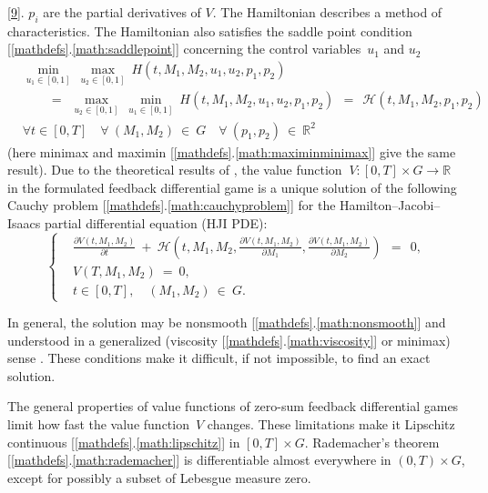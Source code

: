 \documentclass[11pt]{amsart}
\begin{document}
\cref{9}. $p_i$ are the partial derivatives of $V$.  The Hamiltonian describes a method of characteristics. The Hamiltonian also satisfies the saddle point condition [\ref{mathdefs}.\ref{math:saddlepoint}] concerning
the control variables~$ u_1 $ and
$ u_2 $
\begin{equation}
\begin{aligned}
& \min_{u_1 \in [0, 1]} \: \max_{u_2 \in [0, 1]} \: H(t, M_1, M_2, u_1, u_2,
  p_1, p_2) \\
& \qquad
= \:\: \max_{u_2 \in [0, 1]} \: \min_{u_1 \in [0, 1]} \: H(t, M_1, M_2, u_1,
  u_2, p_1, p_2) \:\:
= \:\: \mathcal{H} (t, M_1, M_2, p_1, p_2) \\
& \forall t \in [0, T] \quad \forall \: (M_1, M_2) \: \in \: G \quad \forall
  \: (p_1, p_2) \: \in \: \mathbb{R}^2
\end{aligned}  \label{13}
\end{equation}
(here minimax and maximin [\ref{mathdefs}.\ref{math:maximinminimax}] give the same result). Due to the theoretical
results of \cite[\S XI.6]{FlemingSoner2006}, the value function 
$ \: V \colon [0, T] \times G \to \mathbb{R} \: $ in the formulated feedback
differential game is a unique solution of the following Cauchy problem [\ref{mathdefs}.\ref{math:cauchyproblem}] for the
Hamilton--Jacobi--Isaacs partial differential equation (HJI PDE):
\begin{equation}
\left\{ \begin{aligned}
& \frac{\partial V(t, M_1, M_2)}{\partial t} \: + \: \mathcal{H}
  \left( t, M_1, M_2, \frac{\partial V(t, M_1, M_2)}{\partial M_1},
  \frac{\partial V(t, M_1, M_2)}{\partial M_2} \right) \:\: = \:\: 0, \\
& V(T, M_1, M_2) \: = \: 0, \\
& t \in [0, T], \quad (M_1, M_2) \: \in \: G.
\end{aligned} \right.  \label{15}
\end{equation}

In general, the solution may be 
nonsmooth [\ref{mathdefs}.\ref{math:nonsmooth}] and understood in a generalized (viscosity [\ref{mathdefs}.\ref{math:viscosity}] or minimax) sense \cite{FlemingSoner2006,Subbotin1995}. These conditions make it difficult, if not impossible, to find an exact solution.

The general properties of value functions of zero-sum feedback
differential games \cite{BotkinHoffmannTurova2011} limit how fast the value function~$ V $ changes. These limitations make it Lipschitz continuous [\ref{mathdefs}.\ref{math:lipschitz}] in $ [0, T] \times G $. 
Rademacher's theorem [\ref{mathdefs}.\ref{math:rademacher}]
is differentiable almost everywhere in $ (0, T) \times G $, except
for possibly a 
subset of Lebesgue measure zero. 
\end{document}
